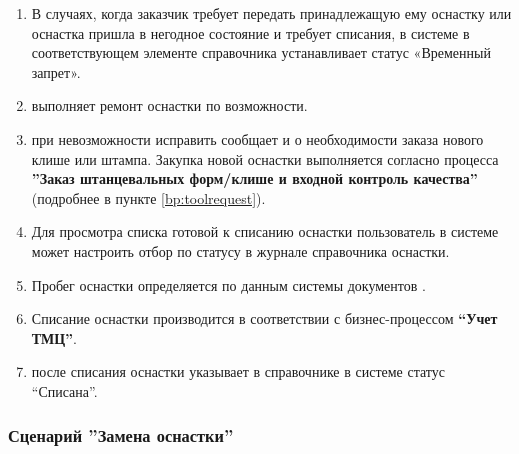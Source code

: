 \begin{enumerate}
\item	В случаях, когда заказчик требует передать принадлежащую ему оснастку или оснастка пришла в негодное состояние и требует списания, \preproductionspecialist в системе \gofro в соответствующем элементе справочника  устанавливает статус «Временный запрет».
\item \operator выполняет ремонт оснастки по возможности.
\item \operator при невозможности исправить  сообщает \preproductionspecialist  и \tehnolog о необходимости заказа
нового клише или штампа. Закупка новой оснастки выполняется согласно процесса \textbf{''Заказ штанцевальных форм/клише и входной контроль качества''} (подробнее в пункте \ref{bp:toolrequest}).
\item	Для просмотра списка готовой к списанию оснастки пользователь в системе \gofro может настроить отбор по статусу в журнале справочника оснастки.
\item Пробег оснастки определяется по данным системы \gofro документов .
\item	Списание оснастки производится в соответствии с бизнес-процессом \textbf{“Учет ТМЦ”}.
\item	\preproductionspecialist после списания оснастки  указывает в справочнике  в системе \gofro статус “Списана”.

\end{enumerate}


\subsubsection{Сценарий ''Замена оснастки''}
\label{bp:tool_3}

